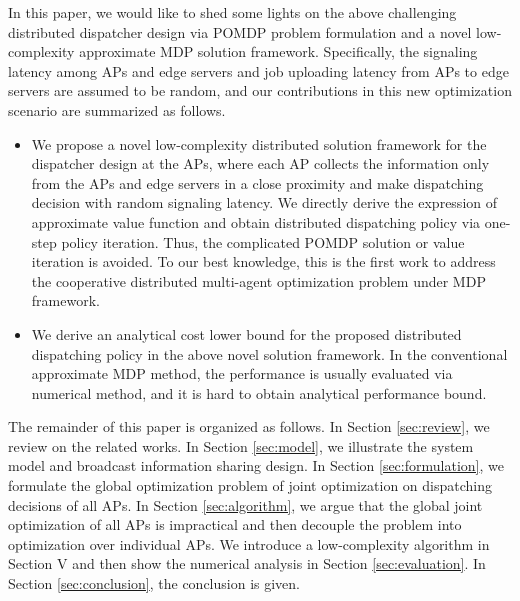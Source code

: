 In this paper, we would like to shed some lights on the above challenging distributed dispatcher design via POMDP problem formulation and a novel low-complexity approximate MDP solution framework.
Specifically, the signaling latency among APs and edge servers and job uploading latency from APs to edge servers are assumed to be random, and our contributions in this new optimization scenario are summarized as follows.
\begin{itemize}
    \item We propose a novel low-complexity distributed solution framework for the dispatcher design at the APs, where each AP collects the information only from the APs and edge servers in a close proximity and make dispatching decision with random signaling latency. We directly derive the expression of approximate value function and obtain distributed dispatching policy via one-step policy iteration. Thus, the complicated POMDP solution or value iteration is avoided. To our best knowledge, this is the first work to address the cooperative distributed multi-agent optimization problem under MDP framework.
    \item We derive an analytical cost lower bound for the proposed distributed dispatching policy in the above novel solution framework. In the conventional approximate MDP method, the performance is usually evaluated via numerical method, and it is hard to obtain analytical performance bound.
\end{itemize}

The remainder of this paper is organized as follows.
In Section \ref{sec:review}, we review on the related works.
In Section \ref{sec:model}, we illustrate the system model and broadcast information sharing design.
In Section \ref{sec:formulation}, we formulate the global optimization problem of joint optimization on dispatching decisions of all APs.
In Section \ref{sec:algorithm}, we argue that the global joint optimization of all APs is impractical and then decouple the problem into optimization over individual APs.
We introduce a low-complexity algorithm in Section V and then show the numerical analysis in Section \ref{sec:evaluation}.
In Section \ref{sec:conclusion}, the conclusion is given.

